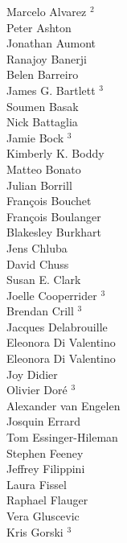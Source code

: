 \documentclass[PICOReport.tex]{subfiles}
\begin{document}
{{\begin{multicols}{4}
Marcelo Alvarez $^2$                \\
Peter Ashton                    \\
Jonathan Aumont                 \\
Ranajoy Banerji                 \\
Belen Barreiro                  \\
James G. Bartlett $^3$              \\
Soumen Basak                    \\
Nick Battaglia              \\
Jamie Bock $^3$                     \\
Kimberly K. Boddy               \\
Matteo Bonato                   \\
Julian Borrill                  \\
Fran\c{c}ois Bouchet            \\
Fran\c{c}ois Boulanger          \\
Blakesley Burkhart              \\
Jens Chluba                     \\
David Chuss                     \\
Susan E. Clark                  \\
Joelle Cooperrider $^3$         \\
Brendan Crill $^3$                 \\
Jacques Delabrouille            \\
Eleonora Di Valentino           \\
Eleonora Di Valentino           \\
Joy Didier                      \\
Olivier Dor\'e  $^3$                 \\
Alexander van Engelen           \\
Josquin Errard                  \\
Tom Essinger-Hileman            \\
Stephen Feeney                  \\
Jeffrey Filippini               \\
Laura Fissel                    \\
Raphael Flauger                 \\
Vera Gluscevic                  \\
Kris Gorski  $^3$                   \\

\end{multicols}}}
\end{document}
